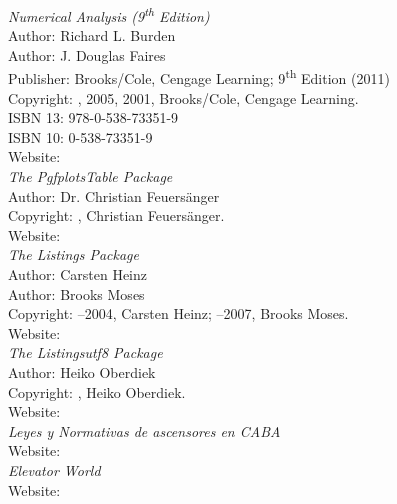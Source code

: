 
\begin{thebibliography}{9}



\emph{Numerical Analysis (9\textsuperscript{th} Edition)}\\
Author: Richard L. Burden\\
Author: J. Douglas Faires\\
Publisher: Brooks/Cole, Cengage Learning; 9\textsuperscript{th} Edition (2011)\\
Copyright: \textcopyright {}, 2005, 2001, Brooks/Cole, Cengage Learning.\\
ISBN 13: 978-0-538-73351-9\\
ISBN 10: 0-538-73351-9\\
Website: \\


\emph{The PgfplotsTable Package}\\
Author: Dr. Christian Feuersänger\\
Copyright: \textcopyright{}, Christian Feuersänger.\\
Website: \\


\emph{The Listings Package}\\
Author: Carsten Heinz\\
Author: Brooks Moses\\
Copyright: \textcopyright{}–2004, Carsten Heinz; \textcopyright{}–2007, Brooks Moses.\\
Website: \\


\emph{The Listingsutf8 Package}\\
Author: Heiko Oberdiek\\
Copyright: \textcopyright{}, Heiko Oberdiek.\\
Website: \\


\emph{Leyes y Normativas de ascensores en CABA}\\
Website: \\


\emph{Elevator World}\\
Website: \\




\end{thebibliography}